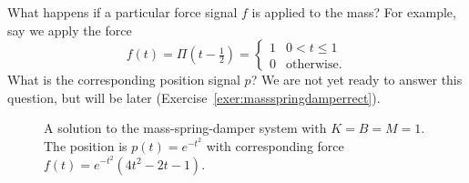 What happens if a particular force signal $f$ is applied to the mass?  For example, say we apply the force
\[
f(t) = \Pi(t - \tfrac{1}{2}) = \begin{cases}
1 & 0 < t \leq 1 \\
0 & \text{otherwise}.
\end{cases}
\]
What is the corresponding position signal $p$?  We are not yet ready to answer this question, but will be later (Exercise~\ref{exer:massspringdamperrect}).  %

\begin{figure}[tp]
\centering
{}
\caption{A solution to the mass-spring-damper system with $K=B=M=1$.  The position is $p(t) = e^{-t^2}$ with corresponding force $f(t) = e^{-t^2} (4 t^2-2 t-1)$.} \label{fig:masspringdampersol1}
\end{figure}

